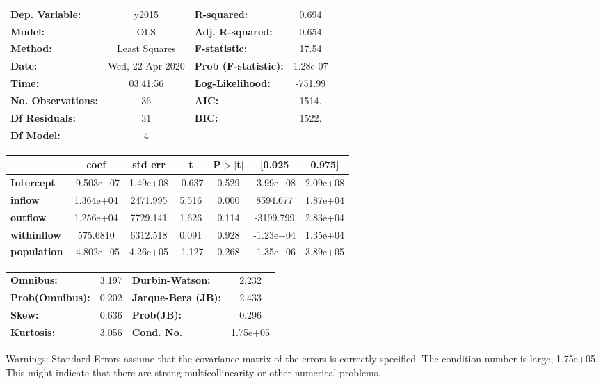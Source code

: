 \begin{center}
\begin{tabular}{lclc}
\toprule
\textbf{Dep. Variable:}    &      y2015       & \textbf{  R-squared:         } &     0.694   \\
\textbf{Model:}            &       OLS        & \textbf{  Adj. R-squared:    } &     0.654   \\
\textbf{Method:}           &  Least Squares   & \textbf{  F-statistic:       } &     17.54   \\
\textbf{Date:}             & Wed, 22 Apr 2020 & \textbf{  Prob (F-statistic):} &  1.28e-07   \\
\textbf{Time:}             &     03:41:56     & \textbf{  Log-Likelihood:    } &   -751.99   \\
\textbf{No. Observations:} &          36      & \textbf{  AIC:               } &     1514.   \\
\textbf{Df Residuals:}     &          31      & \textbf{  BIC:               } &     1522.   \\
\textbf{Df Model:}         &           4      & \textbf{                     } &             \\
\bottomrule
\end{tabular}
\begin{tabular}{lcccccc}
                    & \textbf{coef} & \textbf{std err} & \textbf{t} & \textbf{P$> |$t$|$} & \textbf{[0.025} & \textbf{0.975]}  \\
\midrule
\textbf{Intercept}  &   -9.503e+07  &     1.49e+08     &    -0.637  &         0.529        &    -3.99e+08    &     2.09e+08     \\
\textbf{inflow}     &    1.364e+04  &     2471.995     &     5.516  &         0.000        &     8594.677    &     1.87e+04     \\
\textbf{outflow}    &    1.256e+04  &     7729.141     &     1.626  &         0.114        &    -3199.799    &     2.83e+04     \\
\textbf{withinflow} &     575.6810  &     6312.518     &     0.091  &         0.928        &    -1.23e+04    &     1.35e+04     \\
\textbf{population} &   -4.802e+05  &     4.26e+05     &    -1.127  &         0.268        &    -1.35e+06    &     3.89e+05     \\
\bottomrule
\end{tabular}
\begin{tabular}{lclc}
\textbf{Omnibus:}       &  3.197 & \textbf{  Durbin-Watson:     } &    2.232  \\
\textbf{Prob(Omnibus):} &  0.202 & \textbf{  Jarque-Bera (JB):  } &    2.433  \\
\textbf{Skew:}          &  0.636 & \textbf{  Prob(JB):          } &    0.296  \\
\textbf{Kurtosis:}      &  3.056 & \textbf{  Cond. No.          } & 1.75e+05  \\
\bottomrule
\end{tabular}
\end{center}

Warnings: \newline
 [1] Standard Errors assume that the covariance matrix of the errors is correctly specified. \newline
 [2] The condition number is large, 1.75e+05. This might indicate that there are \newline
 strong multicollinearity or other numerical problems.